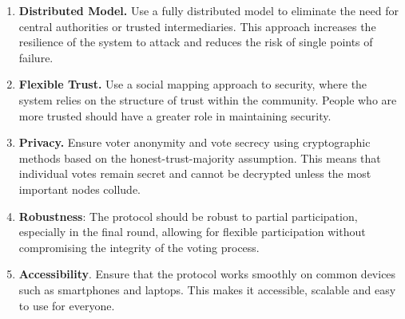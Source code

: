 \documentclass[runningheads]{llncs}
\begin{document}
\begin{enumerate}
    \item \textbf{Distributed Model.} Use a fully distributed model to eliminate the need for central authorities or trusted intermediaries. This approach increases the resilience of the system to attack and reduces the risk of single points of failure.
    \item \textbf{Flexible Trust.} Use a social mapping approach to security, where the system relies on the structure of trust within the community. People who are more trusted should have a greater role in maintaining security.
    \item \textbf{Privacy.} Ensure voter anonymity and vote secrecy using cryptographic methods based on the honest-trust-majority assumption. This means that individual votes remain secret and cannot be decrypted unless the most important nodes collude.
    \item \textbf{Robustness}: The protocol should be robust to partial participation, especially in the final round, allowing for flexible participation without compromising the integrity of the voting process.
    \item \textbf{Accessibility}. Ensure that the protocol works smoothly on common devices such as smartphones and laptops. This makes it accessible, scalable and easy to use for everyone.
\end{enumerate}


\newcommand{\PartySecretKey}[1]{\ensuremath{s_{#1}}}
\newcommand{\Party}[1]{\ensuremath{P_{#1}}}
\newcommand{\Parties}{\ensuremath{\mathbb{P}}}
\newcommand{\VotesSize}{\ensuremath{|\mathbb{V}}|}

\newcommand{\EncryptionKey}{\textbf{E}}
\newcommand{\DecryptionKey}{\textbf{d}}

\newcommand{\PartialDecryptionKey}[1]{\ensuremath{d_{#1}}}
\newcommand{\PartialEncryptionKey}[1]{\ensuremath{E_{#1}}}

\newcommand{\EncryptedPartialDecryptionKeyShare}[2]{\ensuremath{C_{#1,#2}}}
\newcommand{\SetOfEncryptedPartialDecryptionKeys}{\ensuremath{\mathbb{C}}}
\newcommand{\SetOfFDKG}{\ensuremath{\mathbb{D}}}
\newcommand{\SetOfSharesOfPartialDecryption}{\ensuremath{\mathbb{C}}}
\newcommand{\Voters}{\ensuremath{\mathbb{V}}}
\newcommand{\Tallies}{\ensuremath{\mathbb{T}}}
\newcommand{\IthDecryptionKey}[1]{\ensuremath{d_{#1}}}
\newcommand{\IthEncryptionKey}[1]{E_{#1}}

\newcommand{\DecryptionUsingOf}[2]{\ensuremath{\texttt{Dec}_{#1}(#2)}}
\newcommand{\EncryptionUsingOf}[2]{\ensuremath{\texttt{Enc}_{#1}(#2)}}
\end{document}

